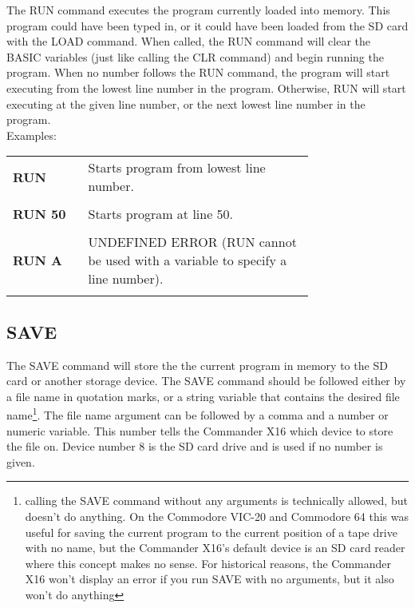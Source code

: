 The {\ttfamily RUN} command executes the program currently loaded into memory.
This program could have been typed in, or it could have been loaded from the SD
card with the {\ttfamily LOAD} command.  When called, the {\ttfamily RUN}
command will clear the BASIC variables (just like calling the {\ttfamily CLR}
command) and begin running the program.  When no number follows the {\ttfamily
RUN} command, the program will start executing from the lowest line number in
the program.  Otherwise, {\ttfamily RUN} will start executing at the given line
number, or the next lowest line number in the program.\\

Examples:\\

\begin{tabular}{l p{0.75\linewidth}}

	{\ttfamily\bfseries RUN}&Starts program from lowest line number.\\\\

	{\ttfamily\bfseries RUN 50}&Starts program at line 50.\\\\

	{\ttfamily\bfseries RUN A}&UNDEFINED ERROR ({\ttfamily RUN} cannot be used
	with a variable to specify a line number).\\\\

\end{tabular}

\subsection{SAVE}

The {\ttfamily SAVE} command will store the the current program in memory to
the SD card or another storage device.  The {\ttfamily SAVE} command should be
followed either by a file name in quotation marks, or a string variable that
contains the desired file name\footnote{calling the {\ttfamily SAVE} command
without any arguments is technically allowed, but doesn't do anything.  On the
Commodore VIC-20 and Commodore 64 this was useful for saving the current
program to the current position of a tape drive with no name, but the Commander
X16's default device is an SD card reader where this concept makes no sense.
For historical reasons, the Commander X16 won't display an error if you run
{\ttfamily SAVE} with no arguments, but it also won't do anything}.  The file
name argument can be followed by a comma and a number or numeric variable.
This number tells the Commander X16 which device to store the file on.  Device
number 8 is the SD card drive and is used if no number is given.\\

